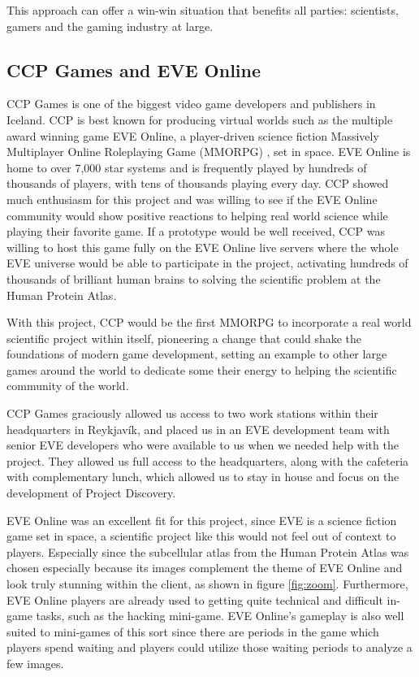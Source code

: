 This approach can offer a win-win situation that benefits all parties: scientists, gamers and the gaming industry at large.

\subsection{CCP Games and EVE Online}

CCP Games \cite{CCP} is one of the biggest video game developers and publishers in Iceland. CCP is best known for producing virtual worlds such as the multiple award winning game EVE Online, a player-driven science fiction Massively Multiplayer Online Roleplaying Game (MMORPG) \cite{mmorpg}, set in space. EVE Online is home to over 7,000 star systems and is frequently played by hundreds of thousands of players, with tens of thousands playing every day. CCP showed much enthusiasm for this project and was willing to see if the EVE Online community would show positive reactions to helping real world science while playing their favorite game. If a prototype would be well received, CCP was willing to host this game fully on the EVE Online live servers where the whole EVE universe would be able to participate in the project, activating hundreds of thousands of brilliant human brains to solving the scientific problem at the Human Protein Atlas.

With this project, CCP would be the first MMORPG to incorporate a real world scientific project within itself, pioneering a change that could shake the foundations of modern game development, setting an example to other large games around the world to dedicate some their energy to helping the scientific community of the world.

CCP Games graciously allowed us access to two work stations within their headquarters in Reykjavík, and placed us in an EVE development team with senior EVE developers who were available to us when we needed help with the project. They allowed us full access to the headquarters, along with the cafeteria with complementary lunch, which allowed us to stay in house and focus on the development of Project Discovery.

EVE Online was an excellent fit for this project, since EVE is a science fiction game set in space, a scientific project like this would not feel out of context to players. Especially since the subcellular atlas from the Human Protein Atlas was chosen especially because its images complement the theme of EVE Online and look truly stunning within the client, as shown in figure \ref{fig:zoom}. Furthermore, EVE Online players are already used to getting quite technical and difficult in-game tasks, such as the hacking mini-game. EVE Online's gameplay is also well suited to mini-games of this sort since there are periods in the game which players spend waiting and players could utilize those waiting periods to analyze a few images.

